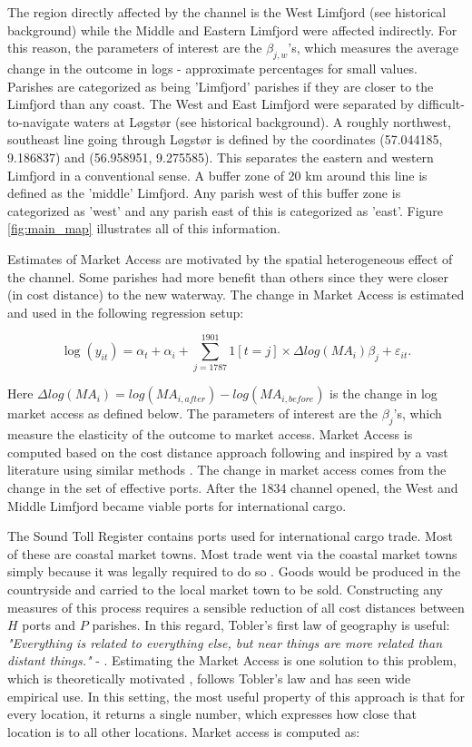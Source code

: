 \documentclass[11pt]{article}
\begin{document}
The region directly affected by the channel is the West Limfjord (see historical background) while the Middle and Eastern Limfjord were affected indirectly. For this reason, the parameters of interest are the $\beta_{j,w}$'s, which measures the average change in the outcome in logs - approximate percentages for small values. Parishes are categorized as being 'Limfjord' parishes if they are closer to the Limfjord than any coast. The West and East Limfjord were separated by difficult-to-navigate waters at Løgstør (see historical background). A roughly northwest, southeast line going through Løgstør is defined by the coordinates (57.044185, 9.186837) and (56.958951, 9.275585). This separates the eastern and western Limfjord in a conventional sense. A buffer zone of 20 km around this line is defined as the 'middle' Limfjord. Any parish west of this buffer zone is categorized as 'west' and any parish east of this is categorized as 'east'. Figure \ref{fig:main_map} illustrates all of this information.

Estimates of Market Access are motivated by the spatial heterogeneous effect of the channel. Some parishes had more benefit than others since they were closer (in cost distance) to the new waterway. The change in Market Access is estimated and used in the following regression setup: 

\begin{equation}
\label{eq:eq503}
\log(y_{it})= \alpha_t + \alpha_i + \sum_{j=1787}^{1901} 1[t=j] \times \Delta log(MA_i)\beta_{j} + \varepsilon_{it}.
\end{equation}

Here $\Delta log(MA_i) = log(MA_{i,after}) - log(MA_{i,before})$ is the change in log market access as defined below. The parameters of interest are the $\beta_{j}$'s, which measure the elasticity of the outcome to market access.  Market Access is computed based on the cost distance approach following \cite{rauch2022a} and inspired by a vast literature using similar methods \citep{Harris1954, Redding2008, Ahlfeldt2015, Donaldson2016}. The change in market access comes from the change in the set of effective ports. After the 1834 channel opened, the West and Middle Limfjord became viable ports for international cargo. 

The Sound Toll Register contains ports used for international cargo trade. Most of these are coastal market towns. Most trade went via the coastal market towns simply because it was legally required to do so \cite{Degn1989}. Goods would be produced in the countryside and carried to the local market town to be sold. Constructing any measures of this process requires a sensible reduction of all cost distances between $H$ ports and $P$ parishes. In this regard, Tobler's first law of geography is useful: \textit{"Everything is related to everything else, but near things are more related than distant things."} - \cite{Tobler1970}. Estimating the Market Access is one solution to this problem, which is theoretically motivated \citep{eaton2002}, follows Tobler's law and has seen wide empirical use. In this setting, the most useful property of this approach is that for every location, it returns a single number, which expresses how close that location is to all other locations. Market access is computed as:
\end{document}
